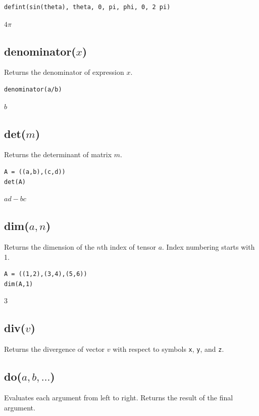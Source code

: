 \documentclass[12pt]{article}
\begin{document}
{\color{blue}
\begin{verbatim}
defint(sin(theta), theta, 0, pi, phi, 0, 2 pi)
\end{verbatim}
}

$4\pi$

\subsection*{denominator($x$)}

Returns the denominator of expression $x$.

{\color{blue}
\begin{verbatim}
denominator(a/b)
\end{verbatim}
}

$b$

\subsection*{det($m$)}

Returns the determinant of matrix $m$.

{\color{blue}
\begin{verbatim}
A = ((a,b),(c,d))
det(A)
\end{verbatim}
}

$a d - b c$

\subsection*{dim($a,n$)}

Returns the dimension of the $n$th index of tensor $a$.
Index numbering starts with 1.

{\color{blue}
\begin{verbatim}
A = ((1,2),(3,4),(5,6))
dim(A,1)
\end{verbatim}
}

$3$

\subsection*{div($v$)}

Returns the divergence of vector $v$ with respect to symbols \verb$x$, \verb$y$, and \verb$z$.

\subsection*{do($a,b,\ldots$)}

Evaluates each argument from left to right.
Returns the result of the final argument.
\end{document}
